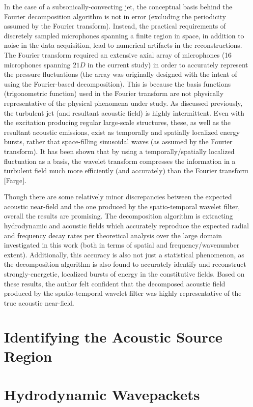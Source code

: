 In the case of a subsonically-convecting jet, the conceptual basis behind the Fourier decomposition algorithm is not in error (excluding the periodicity assumed by the Fourier transform). 
Instead, the practical requirements of discretely sampled microphones spanning a finite region in space, in addition to noise in the data acquisition, lead to numerical artifacts in the reconstructions. 
The Fourier transform required an extensive axial array of microphones (16 microphones spanning $21D$ in the current study) in order to accurately represent the pressure fluctuations (the array was originally designed with the intent of using the  Fourier-based decomposition).  
This is because the basis functions (trigonometric function) used in the Fourier transform are not physically representative of the physical phenomena under study. 
As discussed previously, the turbulent jet (and resultant acoustic field) is highly intermittent. 
Even with the excitation producing regular large-scale structures, these, as well as the resultant acoustic emissions, exist as temporally and spatially localized energy bursts, rather that space-filling sinusoidal waves (as assumed by the Fourier transform). 
It has been shown that by using a temporally/spatially localized fluctuation as a basis, the wavelet transform compresses the information in a turbulent field much more efficiently (and accurately) than the Fourier transform [Farge].

Though there are some relatively minor discrepancies between the expected acoustic near-field and the one produced by the spatio-temporal wavelet filter, overall the results are promising.
The decomposition algorithm is extracting hydrodynamic and acoustic fields which accurately reproduce the expected radial and frequency decay rates per theoretical analysis over the large domain investigated in this work (both in terms of spatial and frequency/wavenumber extent).
Additionally, this accuracy is also not just a statistical phenomenon, as the decomposition algorithm is also found to accurately identify and reconstruct strongly-energetic, localized bursts of energy in the constitutive fields. 
Based on these results, the author felt confident that the decomposed acoustic field produced by the spatio-temporal wavelet filter was highly representative of the true acoustic near-field.

\section{Identifying the Acoustic Source Region}
\section{Hydrodynamic Wavepackets}
\label{sect:near_field_source_region}
